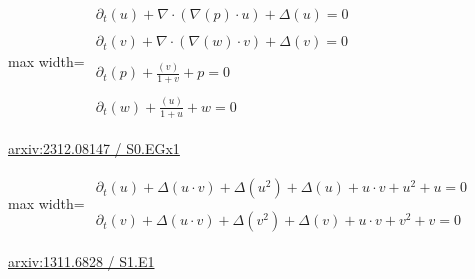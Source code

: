 \documentclass[UTF8,10pt,a4paper,fontset=mac]{ctexart}
\begin{document}
\begin{minipage}{\linewidth}\begin{center}\begin{adjustbox}{max width=\linewidth}$\displaystyle\begin{gathered}\begin{gathered}\partial_{t}(u)+\nabla\cdot(\nabla(p)\cdot u)+\Delta(u)=0\end{gathered}\\[5pt]\begin{gathered}\partial_{t}(v)+\nabla\cdot(\nabla(w)\cdot v)+\Delta(v)=0\end{gathered}\\[5pt]\begin{gathered}\partial_{t}(p)+\frac{(v)}{1+v}+p=0\end{gathered}\\[5pt]\begin{gathered}\partial_{t}(w)+\frac{(u)}{1+u}+w=0\end{gathered}\end{gathered}$\end{adjustbox}\end{center}{\small\href{https://arxiv.org/html/2312.08147#S0.EGx1}{arxiv:2312.08147 / S0.EGx1}}\par\end{minipage}\par\vspace{6mm}

\begin{minipage}{\linewidth}\begin{center}\begin{adjustbox}{max width=\linewidth}$\displaystyle\begin{gathered}\begin{gathered}\partial_{t}(u)+\Delta(u\cdot v)+\Delta(u^{2})+\Delta(u)+u\cdot v+u^{2}+u=0\end{gathered}\\[5pt]\begin{gathered}\partial_{t}(v)+\Delta(u\cdot v)+\Delta(v^{2})+\Delta(v)+u\cdot v+v^{2}+v=0\end{gathered}\end{gathered}$\end{adjustbox}\end{center}{\small\href{https://arxiv.org/html/1311.6828#S1.E1}{arxiv:1311.6828 / S1.E1}}\par\end{minipage}\par\vspace{6mm}
\end{document}
